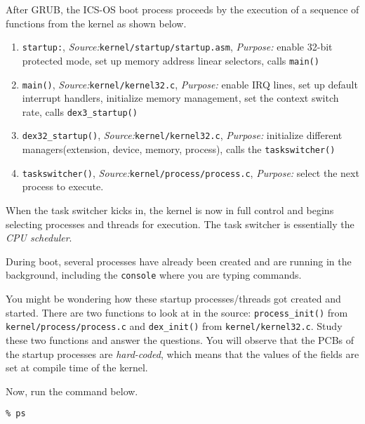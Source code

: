 \documentclass[a4paper, 11pt,oneside]{article}
\begin{document}
After GRUB, the ICS-OS boot process proceeds by the execution of a sequence of functions from the kernel as shown below. 

\begin{enumerate}[itemsep=0pt,parsep=0pt]
    \item{\texttt{startup:}, \textit{Source:}\texttt{kernel/startup/startup.asm}, \textit{Purpose:} enable 32-bit protected mode, set up memory address linear selectors, calls \texttt{main()}}
    
    \item{\texttt{main()}, \textit{Source:}\texttt{kernel/kernel32.c}, \textit{Purpose:} enable IRQ lines, set up default interrupt handlers, initialize memory management, set the context switch rate, calls \texttt{dex3\_startup()}}

    \item{\texttt{dex32\_startup()}, \textit{Source:}\texttt{kernel/kernel32.c}, 
\textit{Purpose:} initialize different managers(extension, device, memory, process), calls the \texttt{taskswitcher()}}
	
	\item{\texttt{taskswitcher()}, \textit{Source:}\texttt{kernel/process/process.c}, 
\textit{Purpose:} select the next process to execute.}
\end{enumerate}   

When the task switcher kicks in, the kernel is now in full control and begins selecting processes and threads for execution. The task switcher is essentially the \textit{CPU scheduler}. 

During boot, several processes have already been created and are running in the background, 
including the \texttt{console} where you are typing commands. 

You might be wondering how these startup processes/threads got created and started. There are two functions to look at in the source:  \texttt{process\_init()} from \texttt{kernel/process/process.c} and \texttt{dex\_init()} from \texttt{kernel/kernel32.c}. Study these two functions and answer the questions. You will observe that 
the PCBs of the startup processes are \textit{hard-coded}, which means that the values of the fields are 
set at compile time of the kernel.

Now, run the command below.

\begin{verbatim}
% ps
\end{verbatim}
\end{document}
